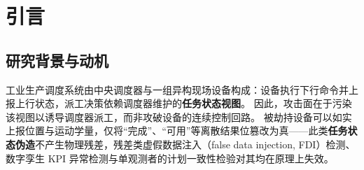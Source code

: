 \documentclass[manuscript,screen,review]{acmart}
\begin{document}
\begin{abstract}
被劫持的现场设备可以如实上报物理量，而仅伪造离散的任务状态；此类伪造不产生物理残差，因而残差检测、过程一致性检验与虚假数据注入检测等以单一观测者为前提的方法，在原理上即无法将其检出（看门狗只能发现完全沉默，无法判别内容真伪）。
已有文献指出了事件触发通信下的沉默攻击面；见证式位置证明多按地理邻居选取见证者，工业心跳机制则仅表征通信活性。现有工作仍缺少两项能力：一是借助\textbf{任务耦合的对端设备}否证完成类虚假声明，二是在\textbf{不依赖共识分歧}的前提下对沉默行为作出确定性归责。
本文提出两条互补的检测通道：在任务图导出的 $O(1)$ 规模见证集上进行耦合互证，以及由哈希链锚定的可问责沉默（accountable silence，即将设备``停止上报''这一行为本身变为可确定性归因的事件）。在互证超图 $H$ 上\textbf{存在对端设备的交接环节}，两通道合用后攻击策略 P1--P3 均不存在可行的获胜分支；在缺乏对端设备的覆盖缺口上，P3 仍可规避检测；一跳串谋（P4）仅延迟判定时刻。心跳间隔 $T_{\mathrm{hb}}$ 由安全时间预算反向求解确定，而非人为选取。
串谋代价由互证超图上前向可达闭包的基数量化（中位数为 5，最坏情形为 1）；检测时延的无条件上界 $r\,T_{\mathrm{hb}}$ 与危害模型导出的时间预算相衔接（相应定理仅适用于沉默通道，运动危害仅用于校准预算量级）。
在 Fischertechnik Trier 工业物联网事件日志上的实验表明：在协议其余部分不变、仅替换见证选取策略时，空间邻居策略只恢复约 52\% 的检出率；对于伪报完成且维持心跳的 P3，仅耦合互证有效；在 $n{=}28$ 的对照规模下，最严格预算口径下的心跳带宽约为 7.7\,KB/s，约为 5\,Hz 全网 PBFT 的 $1/131$。
\end{abstract}


\maketitle

\section{引言}
\label{sec:introduction}

\subsection{研究背景与动机}

工业生产调度系统由中央调度器与一组异构现场设备构成：设备执行下行命令并上报上行状态，派工决策依赖调度器维护的\textbf{任务状态视图}。
因此，攻击面在于污染该视图以诱导调度器派工，而非攻破设备的连续控制回路。
被劫持设备可以如实上报位置与运动学量，仅将``完成''、``可用''等离散结果位篡改为真——此类\textbf{任务状态伪造}不产生物理残差，残差类虚假数据注入（false data injection, FDI）检测、数字孪生 KPI 异常检测与单观测者的计划一致性检验对其均在原理上失效。
\end{document}
